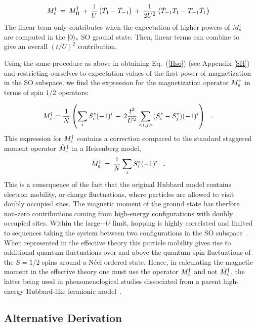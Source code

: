\documentclass[aps,prb,twocolumn,superscriptaddress,
               amsmath]{revtex4}
\newcommand{\eqn}[1]{\vspace{-0.cm}\begin{equation}
#1
\end{equation}}
\renewcommand{\=}{\,=\,}
\newcommand{\+}{\,+\,}
\renewcommand{\-}{\,-\,}
\newcommand{\f}[2]{{\ensuremath{\mathchoice%
        {\dfrac{#1}{#2}}
        {\dfrac{#1}{#2}}
        {\frac{#1}{#2}}
        {\frac{#1}{#2}}
        }}}
\begin{document}
\eqn{M_{\rm s}^{\dag}\,=\, M_{\rm H}^\dagger
\+\f{1}{U}\left(\bar{T}_{1} - \bar{T}_{-1}\right)
 \+ \f{1}{2U^2}\left(\bar{T}_{-1}T_1 - T_{-1}\bar{T}_{1}\right)
\label{effmag}}
The linear term only contributes when the expectation of
higher powers of $M_{\rm s}^\dagger$
are computed in the $\vert 0\rangle_{\rm s}$ SO ground state. Then, linear
terms can combine to give an overall $(t/U)^2$ contribution.

Using the same procedure as above in obtaining Eq.~(\ref{Hso}) (see Appendix \ref{SH}) and restricting ourselves to expectation values of the first power of magnetization in the SO subspace, we find the expression for the magnetization operator $M_{\rm s}^\dagger$ in terms of spin $1/2$ operators:

\begin{equation}
{M^\dagger_{\rm s}} = \frac{1}{N}
\left (\sum_i S_i^z(-1)^i
\,-\,2\frac{t^2}{U^2}\sum_{<i,j>} (S_i^z - S_j^z)(-1)^i \right )
\;\;\; .
\label{M3}
\end{equation}
This expression for $M_{\rm s}^\dagger$ contains a correction compared to the standard staggered moment operator $\tilde M_{\rm s}^\dagger$ in a Heisenberg model,
\begin{equation}
\tilde M_{\rm s}^\dagger\,=\, \frac{1}{N}\sum_i S_i^z(-1)^i	\;\;\; .
\end{equation}
This is a consequence of the fact that the original
Hubbard model contains electron
mobility, or charge fluctuations, where particles are allowed to
visit doubly occupied sites. The magnetic moment of the ground
state has therfore non-zero contributions coming from high-energy
configurations with doubly occupied sites. Within the large$-U$
limit, hopping is highly correlated and limited to sequences
taking the system between two configurations in the SO
subspace~\cite{Chernyshev}. When represented in the effective
theory this particle mobility gives rise to additional quantum
fluctuations over and above the quantum spin fluctuations of the
$S=1/2$ spins around a N\'eel ordered state. Hence,  in
calculating the magnetic moment in the effective theory one must
use the operator $M^\dagger_{\rm s}$ and not $\tilde M^\dagger
_{\rm s}$, the latter being used in phenomenological studies
dissociated from a parent high-energy Hubbard-like fermionic
model~\cite{Sandvik,Lorenzana,Honda,Lauchli,Honda-chain,Katanin}.


\subsection{Alternative Derivation}
\end{document}
